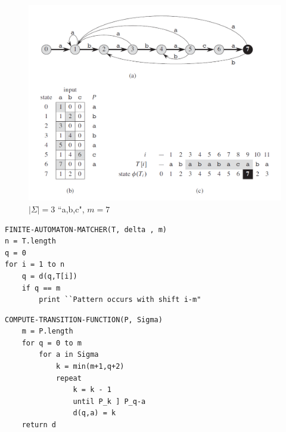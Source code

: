 \documentclass[10pt]{beamer}
\begin{document}
\begin{frame}
    \begin{figure}[h!]
        \centering
        \includegraphics[scale=0.4]{pic2.PNG}
        \caption{$|\Sigma|  = 3$ ``a,b,c", $m = 7$}
    \end{figure}
\end{frame}




\begin{frame}[fragile]
\begin{lstlisting}[style = CStyle]
FINITE-AUTOMATON-MATCHER(T, delta , m)
n = T.length
q = 0 
for i = 1 to n
    q = d(q,T[i])
    if q == m
        print ``Pattern occurs with shift i-m"
\end{lstlisting}
\end{frame}




\begin{frame}[fragile]
\begin{lstlisting}[style = CStyle]
COMPUTE-TRANSITION-FUNCTION(P, Sigma)
    m = P.length
    for q = 0 to m
        for a in Sigma
            k = min(m+1,q+2)
            repeat 
                k = k - 1
                until P_k ] P_q-a
                d(q,a) = k
    return d
\end{lstlisting}
\end{frame}


\end{document}
